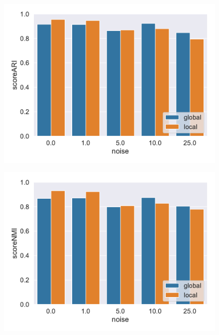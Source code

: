 \begin{figure}[h]
    \centering
    \begin{minipage}[t]{.5\textwidth}
      \centering  
      \captionsetup{width=.9\linewidth}
      \includegraphics[width=\textwidth]{evaluation/Best_ARI_3D_O10000_pnoise_bar.pdf}
      \label{fig:ariperpts}
    \end{minipage}%
    \begin{minipage}[t]{.5\textwidth}
      \centering
      \captionsetup{width=.9\linewidth}
      \includegraphics[width=\textwidth]{evaluation/Best_NMI_3D_O10000_pnoise_bar.pdf}
      \label{fig:nmiperpts}
    \end{minipage}
\end{figure}


